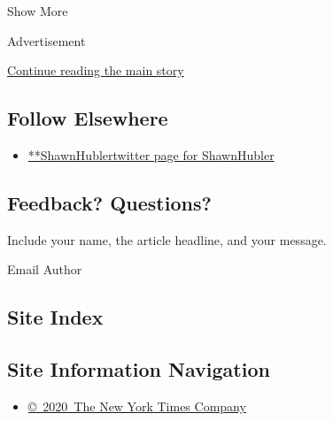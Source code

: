 Show More

Advertisement

\protect\hyperlink{after-mid2}{Continue reading the main story}

\hypertarget{follow-elsewhere}{%
\subsection{Follow Elsewhere}\label{follow-elsewhere}}

\begin{itemize}
\tightlist
\item
  \href{https://twitter.com/ShawnHubler}{**ShawnHublertwitter page for
  ShawnHubler}
\end{itemize}

\hypertarget{feedback-questions}{%
\subsection{Feedback? Questions?}\label{feedback-questions}}

Include your name, the article headline, and your message.

Email Author

\hypertarget{site-index}{%
\subsection{Site Index}\label{site-index}}

\hypertarget{site-information-navigation}{%
\subsection{Site Information
Navigation}\label{site-information-navigation}}

\begin{itemize}
\tightlist
\item
  \href{https://help.nytimes3xbfgragh.onion/hc/en-us/articles/115014792127-Copyright-notice}{©~2020~The
  New York Times Company}
\end{itemize}

